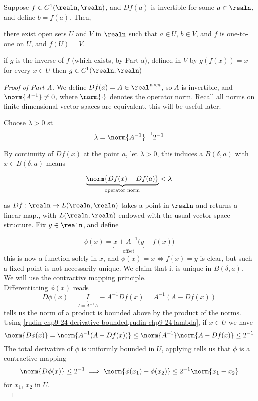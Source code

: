 \documentclass[../main-v2-manifolds.tex]{subfiles}
\begin{document}

\begin{wts}\label{rudin-chp4-theorem-9.24}
    Suppose $f\in C^1(\realn,\realn)$, and $Df(a)$ is invertible for some $a\in\realn$, and define $b=f(a)$. Then,
\begin{enumalpha}
    \item there exist open sets $U$ and $V$ in $\realn$ such that $a\in U$, $b\in V$, and $f$ is one-to-one on $U$, and $f(U)=V$.
    \item if $g$ is the inverse of $f$ (which exists, by Part a), defined in $V$ by $g(f(x))=x$ for every $x\in U$
    then $g\in C^1(\realn,\realn)$
\end{enumalpha}
\end{wts}
\begin{proof}[Proof of Part A]
    We define $Df(a) = A\in\real^{n\times n}$, so $A$ is invertible, and $\norm{A^{-1}}\neq 0$, where $\norm{\cdot}$ denotes the operator norm. Recall all norms on finite-dimensional vector spaces are equivalent, this will be useful later.

    Choose $\lambda > 0$ st
    \begin{equation}\label{rudin-chp9-24-lambda}
        \lambda = \norm{A^{-1}}^{-1}2^{-1}
    \end{equation}

    By continuity of $Df(x)$ at the point $a$, let $\lambda > 0$, this induces a $B(\delta, a)$ with $x\in B(\delta, a)$ means

    \begin{equation}\label{rudin-chp9-24-derivative-bounded}
        \underbrace{\norm{Df(x) - Df(a)}}_{\text{operator norm}}<\lambda
    \end{equation}

    as $Df: \realn\to L(\realn,\realn)$ takes a point in $\realn$ and returns a linear map., with $L(\realn,\realn)$ endowed with the usual vector space structure. Fix $y\in \realn$, and define

    \[
        \phi(x) = \underbracket{x + A^{-1}(y}_{\text{offset}}-f(x))
    \]
    this is now a function solely in $x$, and $\phi(x)=x\iff f(x)=y$ is clear, but such a fixed point is not necessarily unique. We claim that it is unique in $B(\delta, a)$. We will use the contractive mapping principle.\\
    
    Differentiating $\phi(x)$ reads
    \[
        D\phi(x) = \underbrace{I}_{I = A^{-1}A} - A^{-1}Df(x) = A^{-1}(A-Df(x))
    \]
     tells us the norm of a product is bounded above by the product of the norms. Using \cref{rudin-chp9-24-derivative-bounded,rudin-chp9-24-lambda}, if $x\in U$ we have
    \[
        \norm{D\phi(x)} = \norm{A^{-1}(A-Df(x))}\leq \norm{A^{-1}}\norm{A-Df(x)}\leq 2^{-1}
    \]
    The total derivative of $\phi$ is uniformly bounded in $U$, applying  tells us that $\phi$ is a contractive mapping
    \[
        \norm{D\phi(x)}\leq 2^{-1}\implies \norm{\phi(x_1)-\phi(x_2)}\leq 2^{-1}\norm{x_1-x_2}
    \]
    for $x_1$, $x_2$ in $U$.\\


\end{proof}
\end{document}
